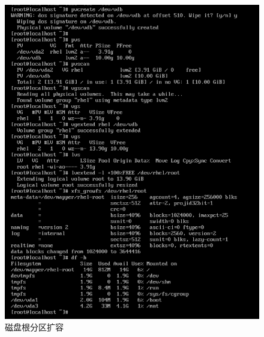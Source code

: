 \begin{figure}[H]
  \centering
  \includegraphics[scale=0.5]{extendlvm.png}
  \caption{磁盘根分区扩容}
  \label{fig:extendlvm}
\end{figure}

